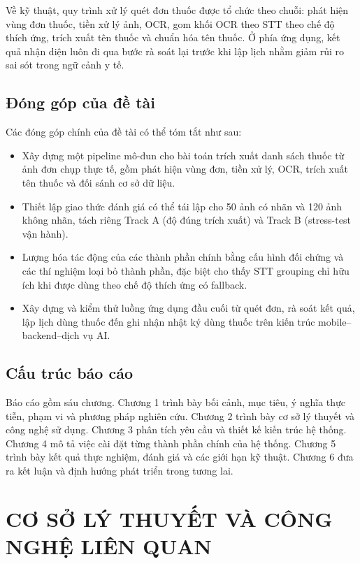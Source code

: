 \documentclass[12pt,a4paper]{report}
\begin{document}
Về kỹ thuật, quy trình xử lý quét đơn thuốc được tổ chức theo chuỗi: phát hiện vùng đơn thuốc, tiền xử lý ảnh, OCR, gom khối OCR theo STT theo chế độ thích ứng, trích xuất tên thuốc và chuẩn hóa tên thuốc. Ở phía ứng dụng, kết quả nhận diện luôn đi qua bước rà soát lại trước khi lập lịch nhằm giảm rủi ro sai sót trong ngữ cảnh y tế.

\section{Đóng góp của đề tài}

Các đóng góp chính của đề tài có thể tóm tắt như sau:

\begin{itemize}[leftmargin=1.5cm]
    \item Xây dựng một pipeline mô-đun cho bài toán trích xuất danh sách thuốc từ ảnh đơn chụp thực tế, gồm phát hiện vùng đơn, tiền xử lý, OCR, trích xuất tên thuốc và đối sánh cơ sở dữ liệu.
    \item Thiết lập giao thức đánh giá có thể tái lập cho 50 ảnh có nhãn và 120 ảnh không nhãn, tách riêng Track A (độ đúng trích xuất) và Track B (stress-test vận hành).
    \item Lượng hóa tác động của các thành phần chính bằng cấu hình đối chứng và các thí nghiệm loại bỏ thành phần, đặc biệt cho thấy STT grouping chỉ hữu ích khi được dùng theo chế độ thích ứng có fallback.
    \item Xây dựng và kiểm thử luồng ứng dụng đầu cuối từ quét đơn, rà soát kết quả, lập lịch dùng thuốc đến ghi nhận nhật ký dùng thuốc trên kiến trúc mobile--backend--dịch vụ AI.
\end{itemize}

\section{Cấu trúc báo cáo}

Báo cáo gồm sáu chương. Chương 1 trình bày bối cảnh, mục tiêu, ý nghĩa thực tiễn, phạm vi và phương pháp nghiên cứu. Chương 2 trình bày cơ sở lý thuyết và công nghệ sử dụng. Chương 3 phân tích yêu cầu và thiết kế kiến trúc hệ thống. Chương 4 mô tả việc cài đặt từng thành phần chính của hệ thống. Chương 5 trình bày kết quả thực nghiệm, đánh giá và các giới hạn kỹ thuật. Chương 6 đưa ra kết luận và định hướng phát triển trong tương lai.

\chapter{CƠ SỞ LÝ THUYẾT VÀ CÔNG NGHỆ LIÊN QUAN}
\end{document}
